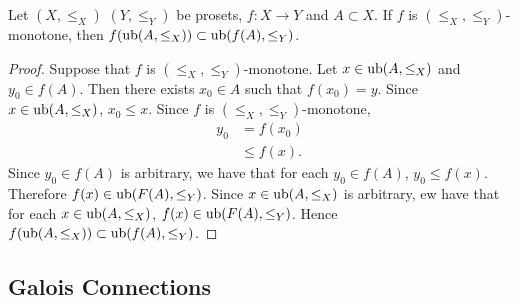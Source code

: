 \documentclass{book}
\begin{document}
	\begin{ex} 
		Let $(X, \leq_X)$ $(Y, \leq_Y)$ be prosets, $f:X \rightarrow Y$ and $A \subset X$. If $f$ is $(\leq_X, \leq_Y)$-monotone, then $f(\operatorname{ub} (A, \leq_X)) \subset \operatorname{ub}(f(A), \leq_Y)$.
	\end{ex}
	
	\begin{proof}
		Suppose that $f$ is $(\leq_X, \leq_Y)$-monotone. Let $x \in \operatorname{ub} (A, \leq_X)$ and $y_0 \in f(A)$. Then there exists $x_0 \in A$ such that $f(x_0) = y$. Since $x \in \operatorname{ub} (A, \leq_X)$, $x_0 \leq x$. Since $f$ is $(\leq_X, \leq_Y)$-monotone,  
		\begin{align*}
			y_0
			& = f(x_0) \\
			& \leq f(x).
		\end{align*}
		Since $y_0 \in f(A)$ is arbitrary, we have that for each $y_0 \in f(A)$, $y_0 \leq f(x)$. Therefore $f(x) \in \operatorname{ub}(F(A), \leq_Y)$. Since $x \in \operatorname{ub} (A, \leq_X)$ is arbitrary, ew have that for each $x \in \operatorname{ub} (A, \leq_X)$, $f(x) \in \operatorname{ub}(F(A), \leq_Y)$. Hence $f(\operatorname{ub} (A, \leq_X)) \subset \operatorname{ub}(f(A), \leq_Y)$.
	\end{proof}
	
	
	
	
	
	
	
	
	
	
	
	
	
	
	
	
	
	
	
	
	
	
	
	
	
	
	
	
	
	
	
	
	
	
	
	
	
	
	
	
	
	
	
	
	
	
	
	
	
	
	
	
	
	\subsection{Galois Connections}
	
\end{document}
